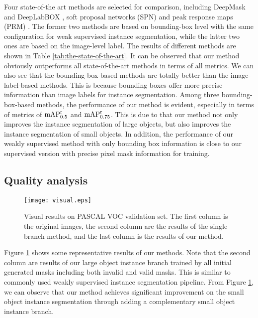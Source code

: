 \documentclass{article}
\begin{document}
Four state-of-the art methods are selected for comparison, including DeepMask \cite{Simple} and DeepLabBOX \cite{Simple}, soft proposal networks (SPN) \cite{SPN} and peak response maps (PRM) \cite{PRM}.
The former two methods are based on bounding-box level with the same configuration for weak supervised instance segmentation, while the latter two ones are based on the image-level label.
The results of different methods are shown in Table \ref{tab:the-state-of-the-art}.
It can be observed that our method obviously outperforms all state-of-the-art methods in terms of all metrics.
We can also see that the bounding-box-based methods are totally better than the image-label-based methods.
This is because bounding boxes offer more precise information than image labels for instance segmentation.
Among three bounding-box-based methods, the performance of our method is evident, especially in terms of metrics of ${\rm{mAP}}_{0.5}^{\rm{r}}$ and  ${\rm{mAP}}_{0.75}^{\rm{r}}$.
This is due to that our method not only improves the instance segmentation of large objects, but also improves the instance segmentation of small objects.
In addition, the performance of our weakly supervised method with only bounding box information is close to our supervised version with precise pixel mask information for training.

\subsection{Quality analysis}
\label{sec:quality analysis}

\begin{figure}[t]
    \setlength{\belowcaptionskip}{-0.3cm}
    \centering
    \texttt{[image: visual.eps]}
    \caption{Visual results on PASCAL VOC validation set. The first column is the original images, the second column are the results of the single branch method, and the last column is the results of our method.}
    \label{fig:visual}
\end{figure}

Figure \ref{fig:visual} shows some representative results of our methods.
Note that the second column are results of our large object instance branch trained by all initial generated masks including both invalid and valid masks.
This is similar to commonly used weakly supervised instance segmentation pipeline.
From Figure \ref{fig:visual}, we can observe that our method achieves significant improvement on the small object instance segmentation through adding a complementary small object instance branch.
\end{document}
